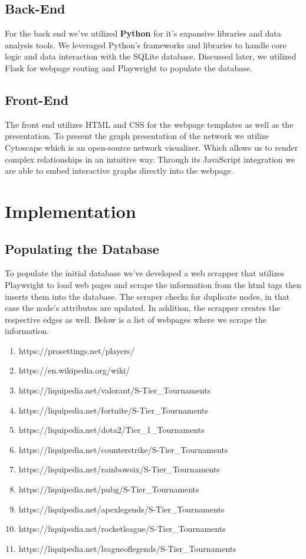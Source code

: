 \documentclass[sigconf]{acmart}
\begin{document}
\subsection{Back-End}
For the back end we've utilized \textbf{Python} for it's expansive libraries and data analysis tools. We leveraged Python’s frameworks and libraries to handle core logic and data interaction with the SQLite database. Discussed later, we utilized Flask for webpage routing and Playwright to populate the database.
\subsection{Front-End}
The front end utilizes HTML and CSS for the webpage templates as well as the presentation. To present the graph presentation of the network we utilize Cytoscape which is an open-source network visualizer. Which allows us to render complex relationships in an intuitive way. Through its JavaScript integration we are able to embed interactive graphs directly into the webpage.

\section{Implementation}
\subsection{Populating the Database}
To populate the initial database we've developed a web scrapper that utilizes Playwright to load web pages and scrape the information from the html tags then inserts them into the database. The scraper checks for duplicate nodes, in that case the node's attributes are updated. In addition, the scrapper creates the respective edges as well. Below is a list of webpages where we scrape the information.

\begin{enumerate}
    \item https://prosettings.net/players/
    \item https://en.wikipedia.org/wiki/
    \item https://liquipedia.net/valorant/S-Tier\_Tournaments
    \item https://liquipedia.net/fortnite/S-Tier\_Tournaments
    \item https://liquipedia.net/dota2/Tier\_1\_Tournaments
    \item https://liquipedia.net/counterstrike/S-Tier\_Tournaments
    \item https://liquipedia.net/rainbowsix/S-Tier\_Tournaments
    \item https://liquipedia.net/pubg/S-Tier\_Tournaments
    \item https://liquipedia.net/apexlegends/S-Tier\_Tournaments
    \item https://liquipedia.net/rocketleague/S-Tier\_Tournaments
    \item https://liquipedia.net/leagueoflegends/S-Tier\_Tournaments
\end{enumerate}
\end{document}
